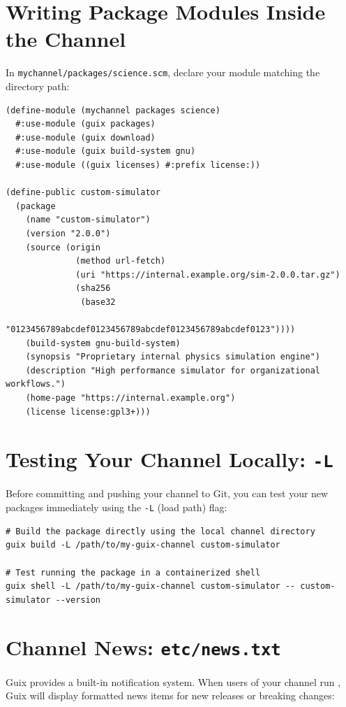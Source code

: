 \section{Writing Package Modules Inside the Channel}

In \texttt{mychannel/packages/science.scm}, declare your module matching the directory path:

\begin{lstlisting}[style=guixscheme]
(define-module (mychannel packages science)
  #:use-module (guix packages)
  #:use-module (guix download)
  #:use-module (guix build-system gnu)
  #:use-module ((guix licenses) #:prefix license:))

(define-public custom-simulator
  (package
    (name "custom-simulator")
    (version "2.0.0")
    (source (origin
              (method url-fetch)
              (uri "https://internal.example.org/sim-2.0.0.tar.gz")
              (sha256
               (base32
                "0123456789abcdef0123456789abcdef0123456789abcdef0123"))))
    (build-system gnu-build-system)
    (synopsis "Proprietary internal physics simulation engine")
    (description "High performance simulator for organizational workflows.")
    (home-page "https://internal.example.org")
    (license license:gpl3+)))
\end{lstlisting}

\section{Testing Your Channel Locally: \texttt{-L}}

Before committing and pushing your channel to Git, you can test your new packages immediately using the \texttt{-L} (load path) flag:

\begin{lstlisting}[style=guixcli]
# Build the package directly using the local channel directory
guix build -L /path/to/my-guix-channel custom-simulator

# Test running the package in a containerized shell
guix shell -L /path/to/my-guix-channel custom-simulator -- custom-simulator --version
\end{lstlisting}

\section{Channel News: \texttt{etc/news.txt}}

Guix provides a built-in notification system. When users of your channel run , Guix will display formatted news items for new releases or breaking changes:

